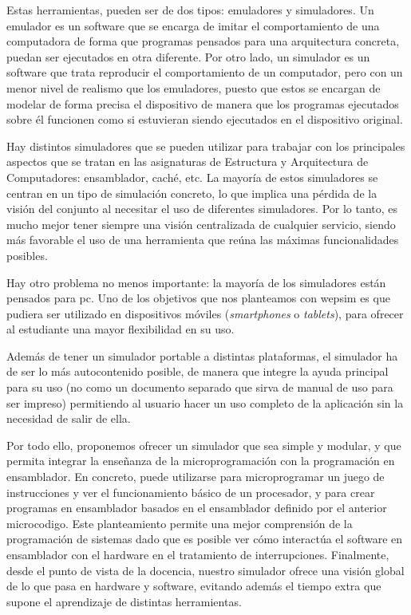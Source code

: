 Estas herramientas, pueden ser de dos tipos: emuladores y simuladores. Un emulador es un \gls{software} que se encarga de imitar el comportamiento de una computadora de forma que programas pensados para una arquitectura concreta, puedan ser ejecutados en otra diferente. Por otro lado, un simulador es un \gls{software} que trata reproducir el comportamiento de un computador, pero con un menor nivel de realismo que los emuladores, puesto que estos se encargan de modelar de forma precisa el dispositivo de manera que los programas ejecutados sobre él funcionen como si estuvieran siendo ejecutados en el dispositivo original.

Hay distintos simuladores que se pueden utilizar para trabajar con los principales aspectos que se tratan en las asignaturas de Estructura y Arquitectura de Computadores: \gls{ensamblador}, caché, etc. La mayoría de estos simuladores se centran en un tipo de simulación concreto, lo que implica una pérdida de la visión del conjunto al necesitar el uso de diferentes simuladores. Por lo tanto, es mucho mejor tener siempre una visión centralizada de cualquier servicio, siendo más favorable el uso de una herramienta que reúna las máximas funcionalidades posibles.

Hay otro problema no menos importante: la mayoría de los simuladores están pensados para \acrshort{pc}. Uno de los objetivos que nos planteamos con \acrshort{wepsim} es que pudiera ser utilizado en dispositivos móviles (\emph{smartphones} o \emph{tablets}), para ofrecer al estudiante una mayor flexibilidad en su uso.

Además de tener un simulador portable a distintas plataformas, el simulador ha de ser lo más autocontenido posible, de manera que integre la ayuda principal para su uso (no como un documento separado que sirva de manual de uso para ser impreso) permitiendo al usuario hacer un uso completo de la aplicación sin la necesidad de salir de ella.

Por todo ello, proponemos ofrecer un simulador que sea simple y modular, y que permita integrar la enseñanza de la microprogramación con la programación en \gls{ensamblador}. En concreto, puede utilizarse para microprogramar un juego de instrucciones y ver el funcionamiento básico de un procesador, y para crear programas en \gls{ensamblador} basados en el \gls{ensamblador} definido por el anterior \gls{microcodigo}. Este planteamiento permite una mejor comprensión de la programación de sistemas dado que es posible ver cómo interactúa el \gls{software} en \gls{ensamblador} con el \gls{hardware} en el tratamiento de interrupciones. Finalmente, desde el punto de vista de la docencia, nuestro simulador ofrece una visión global de lo que pasa en \gls{hardware} y \gls{software}, evitando además el tiempo extra que supone el aprendizaje de distintas herramientas.


